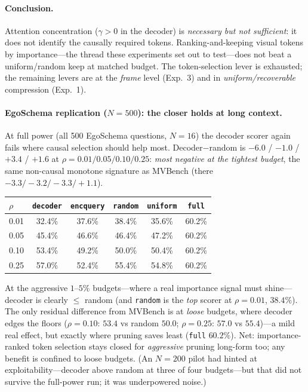 \documentclass[11pt]{article}
\newcommand{\gm}{\gamma}
\begin{document}
\paragraph{Conclusion.} Attention concentration ($\gm>0$ in the decoder) is
\emph{necessary but not sufficient}: it does not identify the causally required tokens.
Ranking-and-keeping visual tokens by importance---the thread these experiments set out to
test---does not beat a uniform/random keep at matched budget. The token-selection lever is
exhausted; the remaining levers are at the \emph{frame} level (Exp.~3) and in
\emph{uniform/recoverable} compression (Exp.~1).

\paragraph{EgoSchema replication ($N{=}500$): the closer holds at long context.} At full
power (all 500 EgoSchema questions, $N{=}16$) the decoder scorer again fails where causal
selection should help most. Decoder$-$random is $-6.0$ / $-1.0$ / $+3.4$ / $+1.6$ at
$\rho=0.01/0.05/0.10/0.25$: \emph{most negative at the tightest budget}, the same non-causal
monotone signature as MVBench (there $-3.3/-3.2/-3.3/+1.1$).

\begin{center}
\begin{tabular}{lccccc}
\toprule
$\rho$ & \texttt{decoder} & \texttt{encquery} & \texttt{random} & \texttt{uniform} & \texttt{full} \\
\midrule
0.01 & 32.4\% & 37.6\% & 38.4\% & 35.6\% & 60.2\% \\
0.05 & 45.4\% & 46.6\% & 46.4\% & 47.2\% & 60.2\% \\
0.10 & 53.4\% & 49.2\% & 50.0\% & 50.4\% & 60.2\% \\
0.25 & 57.0\% & 52.4\% & 55.4\% & 54.8\% & 60.2\% \\
\bottomrule
\end{tabular}
\end{center}

At the aggressive $1$--$5\%$ budgets---where a real importance signal must shine---decoder is
clearly $\le$ random (and \texttt{random} is the \emph{top} scorer at $\rho{=}0.01$,
$38.4\%$). The only residual difference from MVBench is at \emph{loose} budgets, where
decoder edges the floors ($\rho{=}0.10$: $53.4$ vs random $50.0$; $\rho{=}0.25$: $57.0$ vs
$55.4$)---a mild real effect, but exactly where pruning saves least (\texttt{full}
$60.2\%$). Net: importance-ranked token selection stays closed for \emph{aggressive} pruning
long-form too; any benefit is confined to loose budgets. (An $N{=}200$ pilot had hinted at
exploitability---decoder above random at three of four budgets---but that did not survive the
full-power run; it was underpowered noise.)
\end{document}
